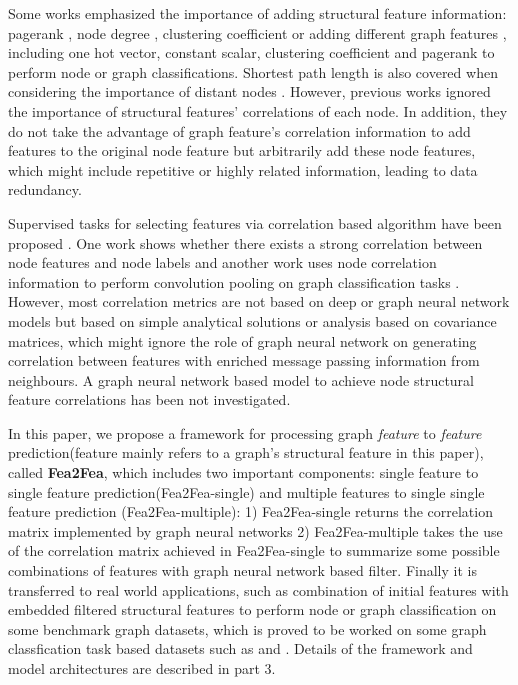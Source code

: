 \documentclass[runningheads]{llncs}
\newcommand{\xhdr}[1]{\vspace{1.7mm}\noindent{{\bf #1}}}
\begin{document}
Some works emphasized the importance of adding structural feature information: pagerank \cite{klicpera2019predict,ilprints422}, node degree \cite{ying2019hierarchical}, clustering coefficient \cite{hamilton2017inductive} or adding different graph features \cite{you2020design}, including one hot vector, constant scalar, clustering coefficient and pagerank to perform node or graph classifications. Shortest path length is also covered when considering the importance of distant nodes \cite{dwivedi2020benchmarking,yin2020revisiting}.  However, previous works ignored the importance of structural features' correlations of each node. In addition, they do not take the advantage of graph feature's correlation information to add features to the original node feature but arbitrarily add these node features, which might include repetitive or highly related information, leading to data redundancy.

Supervised tasks for selecting features via correlation based algorithm have been proposed \cite{doi:10.1260/1748-3018.6.3.385,10.1007/978-981-13-7403-6_4}. One work shows whether there exists a strong correlation between node features and node labels \cite{duong2019node} and another work uses node correlation information to perform convolution pooling on graph classification tasks \cite{10.1145/3414274.3414490}. However, most correlation metrics are not based on deep or graph neural network models but based on simple analytical solutions or analysis based on covariance matrices, which might ignore the role of graph neural network on generating correlation between features with enriched message passing information from neighbours. A graph neural network based model to achieve node structural feature correlations has been not investigated.

\xhdr{Present work} 
In this paper, we propose a framework for processing graph \textit{
feature} to \textit{feature} prediction(feature mainly refers to a graph's structural feature in this paper), called \textbf{Fea2Fea}, which includes two important components: single feature to single feature prediction(Fea2Fea-single) and multiple features to single single feature prediction (Fea2Fea-multiple): 1) Fea2Fea-single returns the correlation matrix implemented by graph neural networks 2) Fea2Fea-multiple takes the use of the correlation matrix achieved in Fea2Fea-single to summarize some possible combinations of features with graph neural network based filter. Finally it is transferred to real world applications, such as combination of initial features with embedded filtered structural features to perform node or graph classification on some benchmark graph datasets, which is proved to be worked on some graph classfication task based datasets such as {} and {}. Details of the framework and model architectures are described in part 3.
\end{document}
